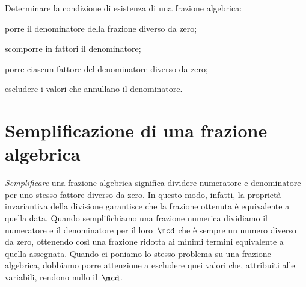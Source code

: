 \begin{procedura}
Determinare la condizione di esistenza di una frazione algebrica:
\begin{enumeratea}
\item porre il denominatore della frazione diverso da zero;
\item scomporre in fattori il denominatore;
\item porre ciascun fattore del denominatore diverso da zero;
\item escludere i valori che annullano il denominatore.
\end{enumeratea}
\end{procedura}
\ovalbox{\risolvi \ref{ese:14.1}}

\section{Semplificazione di una frazione algebrica}

\emph{Semplificare} una frazione algebrica significa dividere numeratore e denominatore per uno stesso fattore diverso da zero.
In questo modo, infatti, la proprietà invariantiva della divisione garantisce che la frazione ottenuta è equivalente a quella data.
Quando semplifichiamo una frazione numerica dividiamo il numeratore e il denominatore per il loro~$\mcd$
che è sempre un numero diverso da zero, ottenendo così una frazione ridotta ai minimi termini equivalente a quella assegnata.
Quando ci poniamo lo stesso problema su una frazione algebrica, dobbiamo porre attenzione a escludere quei valori
che, attribuiti alle variabili, rendono nullo il~$\mcd$.

